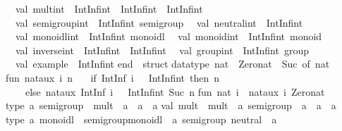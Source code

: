 \begin{isabellebody}
\begin{isamarkuptext}
\begin{typewriter}
\ \ val\ mult{\isacharunderscore}int\ {\isacharcolon}\ IntInf{\isachardot}int\ {\isacharminus}{\isachargreater}\ IntInf{\isachardot}int\ {\isacharminus}{\isachargreater}\ IntInf{\isachardot}int\isanewline
\ \ val\ semigroup{\isacharunderscore}int\ {\isacharcolon}\ IntInf{\isachardot}int\ semigroup\isanewline
\ \ val\ neutral{\isacharunderscore}int\ {\isacharcolon}\ IntInf{\isachardot}int\isanewline
\ \ val\ monoidl{\isacharunderscore}int\ {\isacharcolon}\ IntInf{\isachardot}int\ monoidl\isanewline
\ \ val\ monoid{\isacharunderscore}int\ {\isacharcolon}\ IntInf{\isachardot}int\ monoid\isanewline
\ \ val\ inverse{\isacharunderscore}int\ {\isacharcolon}\ IntInf{\isachardot}int\ {\isacharminus}{\isachargreater}\ IntInf{\isachardot}int\isanewline
\ \ val\ group{\isacharunderscore}int\ {\isacharcolon}\ IntInf{\isachardot}int\ group\isanewline
\ \ val\ example\ {\isacharcolon}\ IntInf{\isachardot}int\isanewline
end\ {\isacharequal}\ struct\isanewline
\isanewline
datatype\ nat\ {\isacharequal}\ Zero{\isacharunderscore}nat\ {\isacharbar}\ Suc\ of\ nat{\isacharsemicolon}\isanewline
\isanewline
fun\ nat{\isacharunderscore}aux\ i\ n\ {\isacharequal}\isanewline
\ \ {\isacharparenleft}if\ IntInf{\isachardot}{\isacharless}{\isacharequal}\ {\isacharparenleft}i{\isacharcomma}\ {\isacharparenleft}{}\ {\isacharcolon}\ IntInf{\isachardot}int{\isacharparenright}{\isacharparenright}\ then\ n\isanewline
\ \ \ \ else\ nat{\isacharunderscore}aux\ {\isacharparenleft}IntInf{\isachardot}{\isacharminus}\ {\isacharparenleft}i{\isacharcomma}\ {\isacharparenleft}{}\ {\isacharcolon}\ IntInf{\isachardot}int{\isacharparenright}{\isacharparenright}{\isacharparenright}\ {\isacharparenleft}Suc\ n{\isacharparenright}{\isacharparenright}{\isacharsemicolon}\isanewline
\isanewline
fun\ nat\ i\ {\isacharequal}\ nat{\isacharunderscore}aux\ i\ Zero{\isacharunderscore}nat{\isacharsemicolon}\isanewline
\isanewline
type\ {\isacharprime}a\ semigroup\ {\isacharequal}\ {\isacharbraceleft}mult\ {\isacharcolon}\ {\isacharprime}a\ {\isacharminus}{\isachargreater}\ {\isacharprime}a\ {\isacharminus}{\isachargreater}\ {\isacharprime}a{\isacharbraceright}{\isacharsemicolon}\isanewline
val\ mult\ {\isacharequal}\ {\isacharhash}mult\ {\isacharcolon}\ {\isacharprime}a\ semigroup\ {\isacharminus}{\isachargreater}\ {\isacharprime}a\ {\isacharminus}{\isachargreater}\ {\isacharprime}a\ {\isacharminus}{\isachargreater}\ {\isacharprime}a{\isacharsemicolon}\isanewline
\isanewline
type\ {\isacharprime}a\ monoidl\ {\isacharequal}\ {\isacharbraceleft}semigroup{\isacharunderscore}monoidl\ {\isacharcolon}\ {\isacharprime}a\ semigroup{\isacharcomma}\ neutral\ {\isacharcolon}\ {\isacharprime}a{\isacharbraceright}{\isacharsemicolon}\isanewline

\end{typewriter}
\end{isamarkuptext}
\end{isabellebody}
